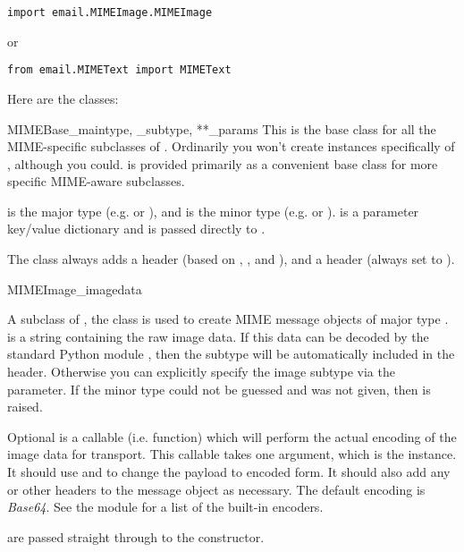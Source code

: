 \begin{verbatim}
import email.MIMEImage.MIMEImage
\end{verbatim}

or

\begin{verbatim}
from email.MIMEText import MIMEText
\end{verbatim}

Here are the classes:

\begin{classdesc}{MIMEBase}{_maintype, _subtype, **_params}
This is the base class for all the MIME-specific subclasses of
.  Ordinarily you won't create instances specifically
of , although you could.   is provided
primarily as a convenient base class for more specific MIME-aware
subclasses.

 is the  major type (e.g.  or
), and  is the  minor type
(e.g.  or ).   is a parameter
key/value dictionary and is passed directly to
.

The  class always adds a  header
(based on , , and ), and a
 header (always set to ).
\end{classdesc}

\begin{classdesc}{MIMEImage}{_imagedata}

A subclass of , the  class is used to
create MIME message objects of major type .
 is a string containing the raw image data.  If this
data can be decoded by the standard Python module ,
then the subtype will be automatically included in the
 header.  Otherwise you can explicitly specify the
image subtype via the  parameter.  If the minor type could
not be guessed and  was not given, then 
is raised.

Optional  is a callable (i.e. function) which will
perform the actual encoding of the image data for transport.  This
callable takes one argument, which is the  instance.
It should use  and  to
change the payload to encoded form.  It should also add any
 or other headers to the message
object as necessary.  The default encoding is \emph{Base64}.  See the
 module for a list of the built-in encoders.

 are passed straight through to the 
constructor.
\end{classdesc}


